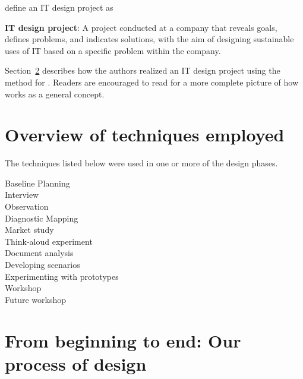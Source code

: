 \cite{bodker2004participatory} define an IT design project as

\begin{figure*}[h!]
    \centering
    \textbf{IT design project}: A project conducted at a company that reveals
    goals, defines problems, and indicates solutions, with the aim of designing
    sustainable uses of IT based on a specific problem within the company.
\end{figure*}

Section~\ref{sec:process} describes how the authors realized an IT design
project using the \must{} method for \gomonkey{}. Readers are encouraged to read 
\cite{bodker2004participatory} for a more complete picture of how \must{} works 
as a general concept.

\section{Overview of techniques employed}

The techniques listed below were used in one or more of the design phases.
\begin{description}
    \item [Baseline Planning]
    \item [Interview]
    \item [Observation]
    \item [Diagnostic Mapping]
    \item [Market study]
    \item [Think-aloud experiment]
    \item [Document analysis]
    \item [Developing scenarios]
    \item [Experimenting with prototypes]
    \item [Workshop]
    \item [Future workshop]
\end{description}

\section{From beginning to end: Our process of design} \label{sec:process}

